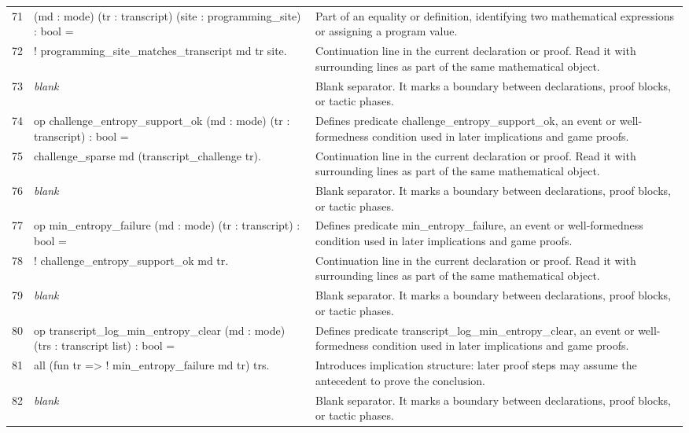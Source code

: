 \documentclass[10pt]{article}
\begin{document}
\begin{longtable}{r L{0.53\textwidth} L{0.37\textwidth}}
71 & {\ttfamily\scriptsize    (md : mode) (tr : transcript) (site : programming\_site) : bool =} & Part of an equality or definition, identifying two mathematical expressions or assigning a program value. \\
72 & {\ttfamily\scriptsize   ! programming\_site\_matches\_transcript md tr site.} & Continuation line in the current declaration or proof.  Read it with surrounding lines as part of the same mathematical object. \\
73 & {\ttfamily\scriptsize \emph{blank}} & Blank separator.  It marks a boundary between declarations, proof blocks, or tactic phases. \\
74 & {\ttfamily\scriptsize op challenge\_entropy\_support\_ok (md : mode) (tr : transcript) : bool =} & Defines predicate challenge\_entropy\_support\_ok, an event or well-formedness condition used in later implications and game proofs. \\
75 & {\ttfamily\scriptsize   challenge\_sparse md (transcript\_challenge tr).} & Continuation line in the current declaration or proof.  Read it with surrounding lines as part of the same mathematical object. \\
76 & {\ttfamily\scriptsize \emph{blank}} & Blank separator.  It marks a boundary between declarations, proof blocks, or tactic phases. \\
77 & {\ttfamily\scriptsize op min\_entropy\_failure (md : mode) (tr : transcript) : bool =} & Defines predicate min\_entropy\_failure, an event or well-formedness condition used in later implications and game proofs. \\
78 & {\ttfamily\scriptsize   ! challenge\_entropy\_support\_ok md tr.} & Continuation line in the current declaration or proof.  Read it with surrounding lines as part of the same mathematical object. \\
79 & {\ttfamily\scriptsize \emph{blank}} & Blank separator.  It marks a boundary between declarations, proof blocks, or tactic phases. \\
80 & {\ttfamily\scriptsize op transcript\_log\_min\_entropy\_clear (md : mode) (trs : transcript list) : bool =} & Defines predicate transcript\_log\_min\_entropy\_clear, an event or well-formedness condition used in later implications and game proofs. \\
81 & {\ttfamily\scriptsize   all (fun tr => ! min\_entropy\_failure md tr) trs.} & Introduces implication structure: later proof steps may assume the antecedent to prove the conclusion. \\
82 & {\ttfamily\scriptsize \emph{blank}} & Blank separator.  It marks a boundary between declarations, proof blocks, or tactic phases. \\

\end{longtable}
\end{document}
